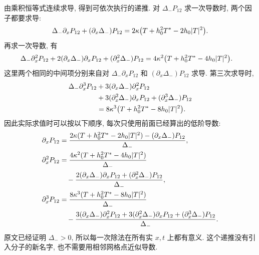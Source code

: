 \par\smallskip\noindent 由乘积恒等式连续求导, 得到可依次执行的递推.\quad
对 $\Delta_-P_{12}$ 求一次导数时, 两个因子都要求导:
\begin{equation*}
\Delta_-\partial_xP_{12}
+(\partial_x\Delta_-)P_{12}
=2\kappa\bigl(T+h_0^2{T}^{*}-2h_0|T|^2\bigr).
\end{equation*}
再求一次导数, 有
\begin{align*}
\Delta_-\partial_x^2P_{12}
+2(\partial_x\Delta_-)\partial_xP_{12}
+(\partial_x^2\Delta_-)P_{12}
&=4\kappa^2
\bigl(T+h_0^2{T}^{*}-4h_0|T|^2\bigr).
\end{align*}
这里两个相同的中间项分别来自对 $\Delta_-\partial_xP_{12}$ 和 $(\partial_x\Delta_-)P_{12}$ 求导. 第三次求导时,
\begin{align*}
\Delta_-\partial_x^3P_{12}
&+3(\partial_x\Delta_-)\partial_x^2P_{12}\\
&+3(\partial_x^2\Delta_-)\partial_xP_{12}
+(\partial_x^3\Delta_-)P_{12}\\
&=8\kappa^3
\bigl(T+h_0^2{T}^{*}-8h_0|T|^2\bigr).
\end{align*}
因此实际求值时可以按以下顺序, 每次只使用前面已经算出的低阶导数:
\begin{align*}
\partial_xP_{12}
&=\dfrac{2\kappa(T+h_0^2{T}^{*}-2h_0|T|^2)
-(\partial_x\Delta_-)P_{12}}{\Delta_-},\\
\partial_x^2P_{12}
&=\dfrac{4\kappa^2(T+h_0^2{T}^{*}-4h_0|T|^2)}{\Delta_-}\\
&\quad-\dfrac{2(\partial_x\Delta_-)\partial_xP_{12}
+(\partial_x^2\Delta_-)P_{12}}{\Delta_-},\\
\partial_x^3P_{12}
&=\dfrac{8\kappa^3(T+h_0^2{T}^{*}-8h_0|T|^2)}{\Delta_-}\\
&\quad-\dfrac{3(\partial_x\Delta_-)\partial_x^2P_{12}
+3(\partial_x^2\Delta_-)\partial_xP_{12}
+(\partial_x^3\Delta_-)P_{12}}{\Delta_-}.
\end{align*}
原文已经证明 $\Delta_->0$, 所以每一次除法在所有实 $x,t$ 上都有意义. 这个递推没有引入分子的新名字, 也不需要用相邻网格点近似导数.

